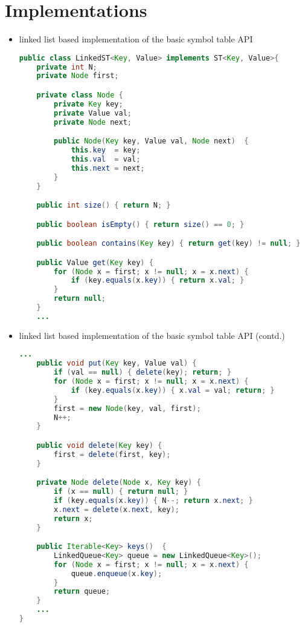 \documentclass[8pt,a4paper,compress]{beamer}
\begin{document}
\section{Implementations}
\begin{frame}[fragile]
\begin{itemize}
\item linked list based implementation of the basic symbol table API

\begin{lstlisting}[language=Java]
public class LinkedST<Key, Value> implements ST<Key, Value>{
    private int N; 
    private Node first; 

    private class Node {
        private Key key;
        private Value val;
        private Node next;

        public Node(Key key, Value val, Node next)  {
            this.key  = key;
            this.val  = val;
            this.next = next;
        }
    }

    public int size() { return N; }

    public boolean isEmpty() { return size() == 0; }

    public boolean contains(Key key) { return get(key) != null; }

    public Value get(Key key) {
        for (Node x = first; x != null; x = x.next) {
            if (key.equals(x.key)) { return x.val; }
        }
        return null;
    }
    ...
\end{lstlisting}
\end{itemize}
\end{frame}

\begin{frame}[fragile]
\begin{itemize}
\item linked list based implementation of the basic symbol table API (contd.)
\begin{lstlisting}[language=Java]
    ...    
    public void put(Key key, Value val) {
        if (val == null) { delete(key); return; }
        for (Node x = first; x != null; x = x.next) {
            if (key.equals(x.key)) { x.val = val; return; }
        }
        first = new Node(key, val, first);
        N++;
    }

    public void delete(Key key) {
        first = delete(first, key);
    }

    private Node delete(Node x, Key key) {
        if (x == null) { return null; }
        if (key.equals(x.key)) { N--; return x.next; }
        x.next = delete(x.next, key);
        return x;
    }

    public Iterable<Key> keys()  {
        LinkedQueue<Key> queue = new LinkedQueue<Key>();
        for (Node x = first; x != null; x = x.next) {
            queue.enqueue(x.key);
        }
        return queue;
    }
    ...
}
\end{lstlisting}
\end{itemize}
\end{frame}
\end{document}
